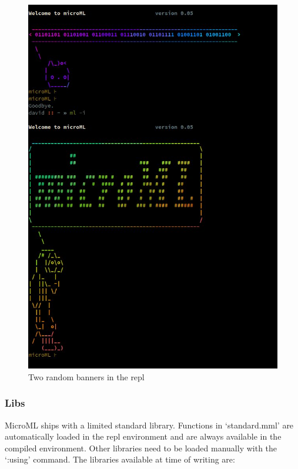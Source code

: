 \documentclass[12pt, a4paper]{report}
\begin{document}
\begin{figure}
    \includegraphics[width=\textwidth]{images/randomBanner.jpg}
    \caption{Two random banners in the repl}
\label{fig:banner}
\end{figure}

\subsubsection{Libs}
\label{libs}
MicroML ships with a limited standard library. Functions in `standard.mml' are automatically loaded
in the repl environment and are always available in the compiled environment. Other libraries need
to be loaded manually with the `:using' command. The libraries available at time of writing are:
\end{document}
